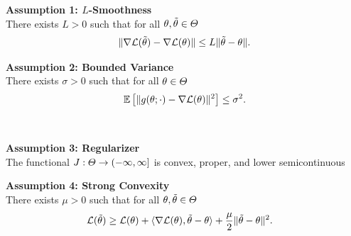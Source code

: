 {{\begin{minipage}[t]{\colwidth}
{\begin{minipage}[t]{.48\textwidth}%
\footnotesize%
\textbf{Assumption 1: $L$-Smoothness}\\
There exists $L>0$ such that for all $\theta,\tilde{\theta}\in\Theta$
\vspace{5pt}
\begin{align*}
\Vert\nabla\mathcal{L}(\tilde{\theta})-\nabla\mathcal{L}(\theta)\Vert\leq L \Vert\tilde{\theta}-\theta\Vert.
\end{align*}%
\end{minipage}%
%
\hfill
%
\begin{minipage}[t]{.48\textwidth}%
\footnotesize%
\textbf{Assumption 2: Bounded Variance}\\
There exists $\sigma>0$ such that for all $\theta\in\Theta$
\begin{align*}
\mathbb{E}\left[\Vert g(\theta;\cdot)-\nabla\mathcal{L}(\theta)\Vert^2\right] \leq \sigma^2.
\end{align*}%
\end{minipage}\hfill%
%
\\[25pt]%
%
\begin{minipage}{\textwidth}%
\small%
\begin{minipage}[t]{.48\textwidth}%
\footnotesize%
\textbf{Assumption 3: Regularizer}\\
The functional $J:\Theta\to(-\infty,\infty]$ is convex, proper, and lower semicontinuous
\end{minipage}%
%
\hfill%
%
\begin{minipage}[t]{.48\textwidth}%
\footnotesize%
\textbf{Assumption 4: Strong Convexity}\\
There exists $\mu>0$ such that for all $\theta,\tilde{\theta}\in\Theta$
\vspace{5pt}
\begin{align*}
\mathcal{L}(\tilde{\theta}) &\geq \mathcal{L}(\theta) + \langle\nabla\mathcal{L}(\theta),\tilde{\theta} - \theta\rangle
+ \frac{\mu}{2}\Vert\tilde{\theta}-\theta\Vert^2.
\end{align*}%
\end{minipage}%
\end{minipage}\hfill%
}\hfill%
\vspace{-25pt}


\end{minipage}}}
